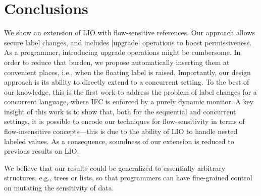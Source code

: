 \section{Conclusions}

We show an extension of LIO with flow-sensitive references. Our approach allows
secure label changes, and includes |upgrade| operations to boost
permissiveness. As a programmer, introducing upgrade operations might be
cumbersome. In order to reduce that burden, we propose automatically inserting
them at convenient places, i.e., when the floating label is raised.
Importantly, our design approach is its ability to directly extend to a
concurrent setting.  To the best of our knowledge, this is the first work to
address the problem of label changes for a concurrent language, where IFC is
enforced by a purely dynamic monitor.  A key insight of this work is to show
that, both for the sequential and concurrent settings, it is possible to encode
our techniques for flow-sensitivity in terms of flow-insensitive
concepts---this is due to the ability of LIO to handle nested labeled values.
As a consequence, soundness of our extension is reduced to previous results on
LIO.

We believe that our results could be generalized to essentially arbitrary
structures, e.g., trees or lists, so that programmers
can have fine-grained control on mutating the sensitivity of data.

